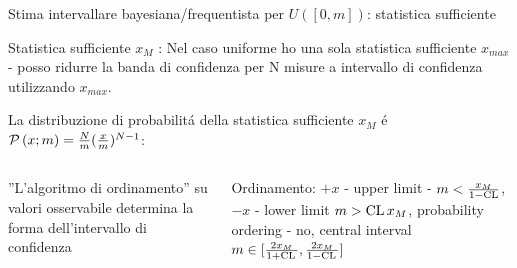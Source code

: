 \documentclass[asd-beamer.tex]{subfiles}
\begin{document}
\begin{wordonframe}{Stima intervallare bayesiana/frequentista per $U([0,m])$: statistica sufficiente}
\begin{block}{Statistica sufficiente $x_M$}
: Nel caso uniforme ho una sola statistica sufficiente $x_{max}$ - posso ridurre la banda di confidenza per N misure a intervallo di confidenza utilizzando $x_{max}$.
\end{block}

La distribuzione di probabilit\'a della statistica sufficiente $x_M$ \'e $\operatorname{\mathcal{P}}{(x;m)}=\frac{N}{m}(\frac{x}{m})^{N-1}$:
\begin{columns}[T]
\begin{column}{0.5\textwidth}
''L'algoritmo di ordinamento'' su valori osservabile determina la forma dell'intervallo di confidenza
\end{column}
\begin{column}{0.5\textwidth}
Ordinamento:
$+x$ - upper limit - $m<\frac{x_M}{1-\operatorname{CL}}$, $-x$ - lower limit $m>\operatorname{CL}{}x_M$, probability ordering - no, central interval $m\in[\frac{2x_M}{1+\operatorname{CL}{}},\frac{2x_M}{1-\operatorname{CL}{}}]$
\end{column}
\end{columns}
\end{wordonframe}
\end{document}
